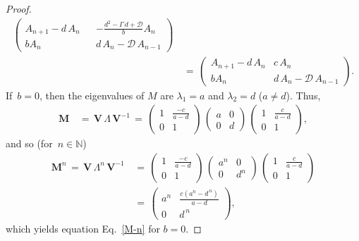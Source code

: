 \documentclass[10pt,a4paper]{amsart}
\def\mM{{\bm{M}}}
\def\mV{{\bm{V}}}
\newcommand{\QED}{}
\renewcommand{\eqref}[1]{Eq.~\ref{#1}}
\begin{document}
\begin{proof}
\begin{align}
\begin{pmatrix}
A_{n+1} -d\,A_n & & -\frac{d^2-\Gamma\,d+\mathcal{D}}{b} A_n \\[1ex]
%
b A_n & &  d\,A_n - \mathcal{D}\, A_{n-1}
\end{pmatrix}
%
%
\\[2ex]\label{}
%
&
 \, = \, \begin{pmatrix}
A_{n+1} -d\,A_n & c\, A_n \\[1ex]
%
b A_n &  d\,A_n - \mathcal{D}\, A_{n-1}
\end{pmatrix}.
\end{align}
\endgroup
If $\,b=0$, then the eigenvalues of $M$ are $\lambda_1=a$ and $\lambda_2=d$ ($a \neq d$). Thus,
\begin{align}\label{}
%
\mM &\, = \, \mV \, \Lambda \, \mV^{-1} \, = \, 
\begin{pmatrix}
1 & \frac{-c}{a-d} \\[1ex]
0 & 1
\end{pmatrix}
\, 
\begin{pmatrix}
a & 0 \\[1ex]
0 & d
\end{pmatrix}
\,
\begin{pmatrix}
1 & \frac{c}{a-d} \\[1ex]
0 & 1 
\end{pmatrix},
%
\end{align}
and so (for $\,n \in \mathbb{N}$)
\begingroup
\allowdisplaybreaks
\begin{align}\nonumber
\mM^n \, = \, \mV \, \Lambda^n \, \mV^{-1} & \, = \,
\begin{pmatrix}
1 & \frac{-c}{a-d} \\[1ex]
0 & 1
\end{pmatrix}
\, 
\begin{pmatrix}
a^n & 0 \\[1ex]
0 & d^n
\end{pmatrix}
\,
\begin{pmatrix}
1 & \frac{c}{a-d} \\[1ex]
0 & 1 
\end{pmatrix}
%
\\[1ex]\label{M-n-0}
%
&\, = \, \begin{pmatrix}
a^n & \frac{c(a^n-d^{\,n})}{a-d} \\[1ex]
%
0 &  d^{\,n}
\end{pmatrix}, 
\end{align}
\endgroup
which yields equation \eqref{M-n} for $b=0$. \QED
\end{proof}
\end{document}
